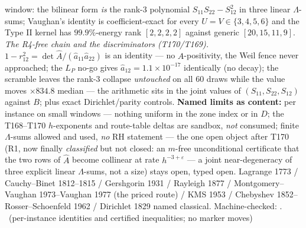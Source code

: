 \documentclass[11pt,a4paper]{article}
\theoremstyle{definition}
\begin{document}
window: the bilinear form \emph{is} the rank-3 polynomial
$S_{11}S_{22}-S_{12}^2$ in three linear $\Lambda$-sums; Vaughan's
identity is coefficient-exact for every $U=V\in\{3,4,5,6\}$ and the Type
II kernel has $99.9\%$-energy rank $[2,2,2,2]$ against generic
$[20,15,11,9]$.
\emph{The R4-free chain and the discriminators (T170/T169).}
$1-r_{12}^2=\det\hat A/(\hat a_{11}\hat a_{22})$ is an identity --- no
$A$-positivity, the Weil fence never approached; the $L_P$ no-go gives
$\hat a_{12}=1.1\times10^{-17}$ identically (no decay); the scramble
leaves the rank-3 collapse \emph{untouched} on all $60$ draws while the
value moves $\times834.8$ median --- the arithmetic sits in the joint
values of $(S_{11},S_{22},S_{12})$ against $B$; plus exact
Dirichlet/parity controls.
\textbf{Named limits as content:} per instance on small windows ---
nothing uniform in the zone index or in $D$; the T168--T170 $h$-exponents
and route-table deltas are sandbox, \emph{not} consumed; finite
$\Lambda$-sums allowed and used, \emph{no} RH statement --- the one open
object after T170 (R1, now finally \emph{classified} but not closed: an
$m$-free unconditional certificate that the two rows of $\hat A$ become
collinear at rate $h^{-3+\varepsilon}$ --- a joint near-degeneracy of
three explicit linear $\Lambda$-sums, not a size) stays open, typed open.
Lagrange 1773 / Cauchy--Binet 1812--1815 / Gershgorin 1931 / Rayleigh 1877
/ Montgomery--Vaughan 1973--Vaughan 1977 (the priced route) / KMS 1953 /
Chebyshev 1852--Rosser--Schoenfeld 1962 / Dirichlet 1829 named classical.
Machine-checked:
.
\mE\ (per-instance identities and certified inequalities; no marker moves)
\end{document}
